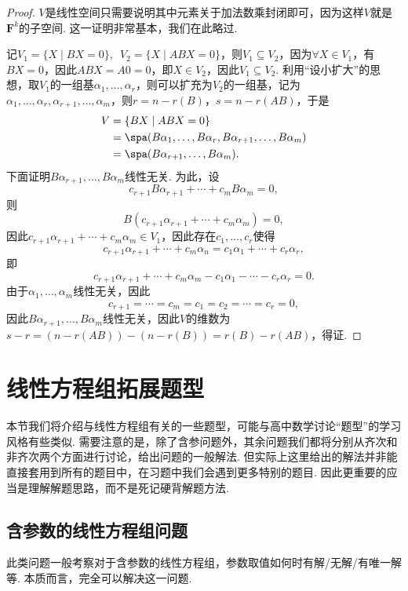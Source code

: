 \begin{proof}
    $V$是线性空间只需要说明其中元素关于加法数乘封闭即可，因为这样$V$就是$\mathbf{F}^k$的子空间. 这一证明非常基本，我们在此略过.

    记$V_1=\{X\mid BX=0\},\enspace V_2=\{X\mid ABX=0\}$，则$V_1\subseteq V_2$，因为$\forall X\in V_1$，有$BX=0$，因此$ABX=A0=0$，即$X\in V_2$，因此$V_1\subseteq V_2$. 利用``设小扩大''的思想，取$V_1$的一组基$\alpha_1,\ldots,\alpha_r$，则可以扩充为$V_2$的一组基，记为$\alpha_1,\ldots,\alpha_r,\alpha_{r+1},\ldots,\alpha_m$，则$r=n-r(B)$，$s=n-r(AB)$，于是
    \begin{align*}
        V & =\{BX\mid ABX=0\}                                                \\
          & =\spa(B\alpha_1,\ldots,B\alpha_r,B\alpha_{r+1},\ldots,B\alpha_m) \\
          & =\spa(B\alpha_{r+1},\ldots,B\alpha_m).
    \end{align*}
    下面证明$B\alpha_{r+1},\ldots,B\alpha_m$线性无关. 为此，设
    \[c_{r+1}B\alpha_{r+1}+\cdots+c_mB\alpha_m=0,\]
    则
    \[B(c_{r+1}\alpha_{r+1}+\cdots+c_m\alpha_m)=0,\]
    因此$c_{r+1}\alpha_{r+1}+\cdots+c_m\alpha_m\in V_1$，因此存在$c_1,\ldots,c_r$使得
    \[c_{r+1}\alpha_{r+1}+\cdots+c_m\alpha_n=c_1\alpha_1+\cdots+c_r\alpha_r,\]
    即
    \[c_{r+1}\alpha_{r+1}+\cdots+c_m\alpha_m-c_1\alpha_1-\cdots-c_r\alpha_r=0.\]
    由于$\alpha_1,\ldots,\alpha_m$线性无关，因此
    \[c_{r+1}=\cdots=c_m=c_1=c_2=\cdots=c_r=0,\]
    因此$B\alpha_{r+1},\ldots,B\alpha_m$线性无关，因此$V$的维数为$s-r=(n-r(AB))-(n-r(B))=r(B)-r(AB)$，得证.
\end{proof}

\section{线性方程组拓展题型}

本节我们将介绍与线性方程组有关的一些题型，可能与高中数学讨论``题型''的学习风格有些类似. 需要注意的是，除了含参问题外，其余问题我们都将分别从齐次和非齐次两个方面进行讨论，给出问题的一般解法. 但实际上这里给出的解法并非能直接套用到所有的题目中，在习题中我们会遇到更多特别的题目. 因此更重要的应当是理解解题思路，而不是死记硬背解题方法.

\subsection{含参数的线性方程组问题}

此类问题一般考察对于含参数的线性方程组，参数取值如何时有解/无解/有唯一解等. 本质而言，完全可以解决这一问题.

